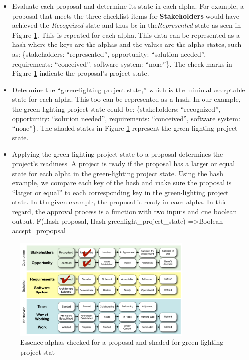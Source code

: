 \documentclass[conference]{IEEEtran}
\begin{document}
\begin{itemize}
\itemsep1pt\parskip0pt
\item
  Evaluate each proposal and determine its state in each alpha. For
  example, a proposal that meets the three checklist items for
   \textbf{Stakeholders} would have achieved the \textit{Recognized} state and thus
  be in the\textit{Represented} state as seen in Figure
  \ref{EssenceAlpha}. This is repeated for each alpha.
  This data can be represented as a hash where the keys are the alphas
  and the values are the alpha states, such as: \{stakeholders:
  ``represented'', opportunity: ``solution needed'', requirements:
  ``conceived'', software system: ``none''\}. The check marks in Figure
  \ref{EssenceAlpha} indicate the proposal's project
  state.
\item
  Determine the ``green-lighting project state,'' which is the minimal
  acceptable state for each alpha. This too can be represented as a
  hash. In our example, the green-lighting project state could be:
  \{stakeholders: ``recognized'', opportunity: ``solution needed'',
  requirements: ``conceived'', software system: ``none''\}. The shaded
  states in Figure \ref{EssenceAlpha} represent the
  green-lighting project state.
\item
  Applying the green-lighting project state to a proposal determines
  the project's readiness. A project is ready if the proposal has a
  larger or equal state for each alpha in the green-lighting project
  state. Using the hash example, we compare each key of the hash and
  make sure the proposal is ``larger or equal'' to each corresponding
  key in the green-lighting project state. In the given example, the
  proposal is ready in each alpha. In this regard, the approval process
  is a function with two inputs and one boolean output. F(Hash proposal,
  Hash greenlight\_project\_state) =\textgreater Boolean
  accept\_propopsal
\end{itemize}



\begin{figure}[!t]
\centering
\includegraphics[width=3.45in]{EssenceAlpha.jpg}
\caption{Essence alphas checked for a proposal and shaded for
green-lighting project stat}
\label{EssenceAlpha}
\end{figure}
\end{document}
